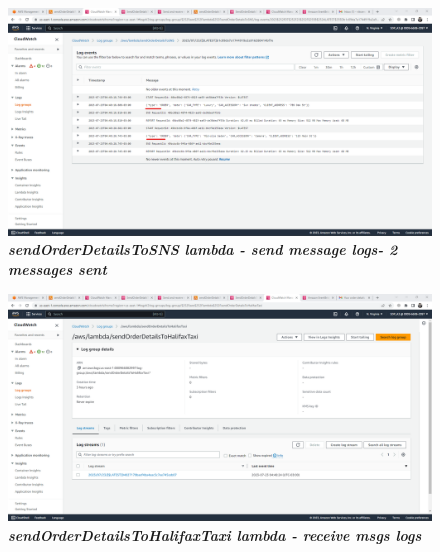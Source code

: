     \begin{figure}[htp]
        \centering
        \includegraphics[scale=1, width=15cm]{PROBLEM 3/Screenshots/4.2 sendOrderDetailsToSNS lambda - send message - 2 messages sent.png}
        \caption{\textbf{\textit{sendOrderDetailsToSNS lambda - send message logs- 2 messages sent}}}
        \label{fig:}
    \end{figure}

    \begin{figure}[htp]
        \centering
        \includegraphics[scale=1, width=15cm]{PROBLEM 3/Screenshots/5.1 sendOrderDetailsToHalifaxTaxi lambda - receive msgs - logs.png}
        \caption{\textbf{\textit{sendOrderDetailsToHalifaxTaxi lambda - receive msgs logs}}}
        \label{fig:}
    \end{figure}

